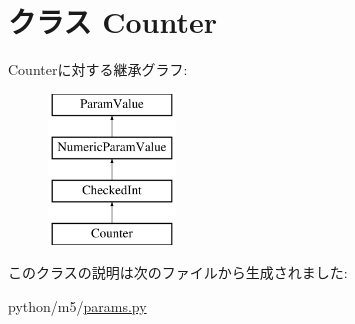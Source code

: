 \hypertarget{classm5_1_1params_1_1Counter}{
\section{クラス Counter}
\label{classm5_1_1params_1_1Counter}
}
Counterに対する継承グラフ:\begin{figure}[H]
\begin{center}
\leavevmode
\includegraphics[height=4cm]{classm5_1_1params_1_1Counter}
\end{center}
\end{figure}


このクラスの説明は次のファイルから生成されました:\begin{DoxyCompactItemize}
\item 
python/m5/\hyperlink{params_8py}{params.py}\end{DoxyCompactItemize}
